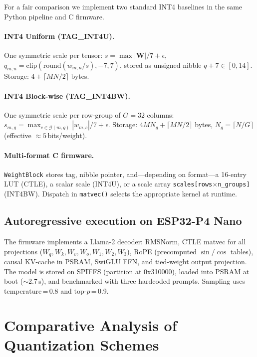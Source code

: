 \documentclass[lettersize,journal]{IEEEtran}
\begin{document}
For a fair comparison we implement two standard INT4 baselines in the same
Python pipeline and C firmware.

\paragraph{INT4 Uniform (TAG\_INT4U).}
One symmetric scale per tensor:
$s = \max|\mathbf{W}|/7 + \epsilon$,
$q_{m,n} = \mathrm{clip}(\mathrm{round}(w_{m,n}/s), -7, 7)$,
stored as unsigned nibble $q+7\in[0,14]$.
Storage: $4 + \lceil MN/2\rceil$ bytes.

\paragraph{INT4 Block-wise (TAG\_INT4BW).}
One symmetric scale per row-group of $G=32$ columns:
$s_{m,g} = \max_{c\in\mathcal{G}(m,g)}|w_{m,c}|/7 + \epsilon$.
Storage: $4MN_g + \lceil MN/2\rceil$ bytes,
$N_g=\lceil N/G\rceil$ (effective $\approx5$\,bits/weight).

\paragraph{Multi-format C firmware.}
\texttt{WeightBlock} stores tag, nibble pointer, and---depending on format---a
16-entry LUT (CTLE), a scalar scale (INT4U), or a scale array
\texttt{scales[rows$\times$n\_groups]} (INT4BW).
Dispatch in \texttt{matvec()} selects the appropriate kernel at runtime.

\subsection{Autoregressive execution on ESP32-P4 Nano}
\label{subsec:hw}

The firmware implements a Llama-2 decoder: RMSNorm, CTLE matvec for all
projections ($W_q,W_k,W_v,W_o,W_1,W_2,W_3$), RoPE (precomputed
$\sin/\cos$ tables), causal KV-cache in PSRAM, SwiGLU FFN, and
tied-weight output projection.
The model is stored on SPIFFS (partition at 0x310000), loaded into PSRAM at
boot ($\sim$2.7\,s), and benchmarked with three hardcoded prompts.
Sampling uses temperature\,=\,0.8 and top-$p$\,=\,0.9.


\section{Comparative Analysis of Quantization Schemes}
\label{sec:analysis}
\end{document}
